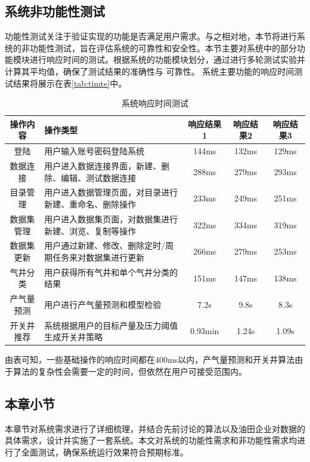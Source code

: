 \subsection{系统非功能性测试}
功能性测试关注于验证实现的功能是否满足用户需求。与之相对地，本节将进行系统的非功能性测试，旨在评估系统的可靠性和安全性。本节主要对系统中的部分功能模块进行响应时间的测试。根据系统的功能模块划分，通过进行多轮测试实验并计算其平均值，确保了测试结果的准确性与
可靠性。
系统主要功能的响应时间测试结果将展示在表\ref{tab:timte}中。
\begin{table}[H]
    \renewcommand{\arraystretch}{1.5}
    \centering
    \caption{系统响应时间测试}
    \begin{tabularx}{\textwidth}{|c|Y|c|c|c|}
        \hline
       操作内容& 操作类型 & 响应结果1 & 响应结果2 & 响应结果3 \\
       \hline
       登陆 & 用户输入账号密码登陆系统 & 144ms & 132ms & 129ms \\
       \hline
       数据连接 & 用户进入数据连接界面，新建、删除、编辑、测试数据连接 & 288ms & 279ms &293ms \\
       \hline
       目录管理 & 用户进入数据管理页面，对目录进行新建、重命名、删除操作 & 233ms & 249ms & 251ms \\
       \hline
       数据集管理 & 用户进入数据集页面，对数据集进行新建、浏览、复制等操作 & 322ms & 334ms & 319ms \\
       \hline
       数据集更新 & 用户通过新建、修改、删除定时/周期任务来对数据集进行更新 & 266ms &279ms &253ms \\
        \hline
        气井分类 & 用户获得所有气井和单个气井分类的结果 & 151ms & 147ms & 138ms\\ 
        \hline 
        产气量预测 & 用户进行产气量预测和模型检验 & 7.2s & 9.8s & 8.3s \\
        \hline
        开关井推荐 & 系统根据用户的目标产量及压力阈值生成开关井策略 & 0.93min & 1.24s & 1.09s \\
        \hline
    \end{tabularx}
\end{table}
由表可知，一些基础操作的响应时间都在400ms以内，产气量预测和开关井算法由于算法的复杂性会需要一定的时间，但依然在用户可接受范围内。
\subsection{本章小节}
本章节对系统需求进行了详细梳理，并结合先前讨论的算法以及油田企业对数据的具体需求，设计并实施了一套系统。本文对系统的功能性需求和非功能性需求均进行了全面测试，确保系统运行效果符合预期标准。





